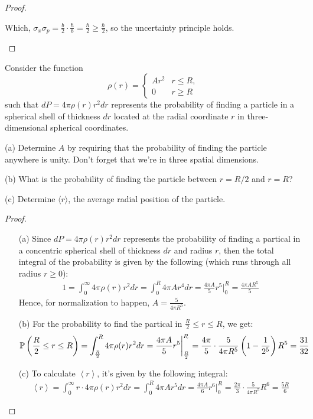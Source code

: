 \documentclass{article}
\begin{document}
\begin{proof}
\begin{itemize}
        Which, $\sigma_x\sigma_p = \frac{b}{2}\cdot\frac{\hbar}{b} = \frac{\hbar}{2}\geq \frac{\hbar}{2}$, so the uncertainty principle holds.
    \end{itemize}
\end{proof}

\newpage

\begin{ques}\label{q3}
Consider the function
\[
\rho(r) =
\begin{cases}
Ar^2 & r \leq R,\\
0 & r \geq R
\end{cases}
\]
such that $dP = 4\pi \rho(r) r^2 dr$ represents the probability of finding a particle in a spherical shell of thickness $dr$ located at the radial coordinate $r$ in three-dimensional spherical
coordinates.

(a) Determine $A$ by requiring that the probability of finding the particle anywhere is
unity. Don’t forget that we’re in three spatial dimensions.

(b) What is the probability of finding the particle between $r = R/2$ and $r = R$?

(c) Determine $\langle r\rangle$, the average radial position of the particle.
\end{ques}
\begin{proof}

    \hfil

    \begin{itemize}
        \item[(a)] Since $dP=4\pi \rho(r)r^2 dr$ represents the probability of finding a partical in a concentric spherical shell of thickness $dr$ and radius $r$, then the total integral of the probability is given by the following (which runs through all radius $r\geq 0$):
        \begin{align}
            1 = \int_{0}^{\infty}4\pi\rho(r)r^2 dr = \int_{0}^{R}4\pi A r^4dr = \frac{4\pi A}{5}r^5\bigg|_{0}^{R} = \frac{4\pi AR^5}{5}
        \end{align}
        Hence, for normalization to happen, $A = \frac{5}{4\pi R^5}$.
        \item[(b)] For the probability to find the partical in $\frac{R}{2}\leq r\leq R$, we get:
        \begin{align}
            \mathbb{P}\left(\frac{R}{2}\leq r\leq R\right)=\int_{\frac{R}{2}}^{R}4\pi \rho(r)r^2dr = \frac{4\pi A}{5}r^5\bigg|_{\frac{R}{2}}^{R}=\frac{4\pi }{5}\cdot\frac{5}{4\pi R^5}\left(1-\frac{1}{2^5}\right)R^5 = \frac{31}{32}
        \end{align}
        \item[(c)] To calculate $\left<r\right>$, it's given by the following integral:
        \begin{align}
            \left<r\right>=\int_{0}^{\infty}r \cdot 4\pi \rho(r)r^2 dr = \int_{0}^{R}4\pi A r^5 dr = \frac{4\pi A}{6}r^6\bigg|_{0}^{R} = \frac{2\pi}{3}\cdot \frac{5}{4\pi R^5}R^6=\frac{5R}{6}
        \end{align}
    \end{itemize}
\end{proof}
\newpage
\end{document}
